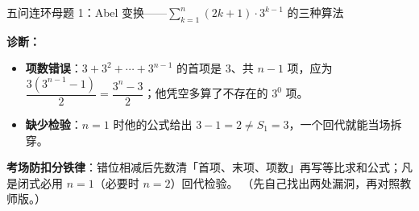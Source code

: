 \begin{methodbox}{五问连环母题 1：Abel 变换——$\sum_{k=1}^n(2k+1)\cdot3^{k-1}$ 的三种算法}
\begin{enumerate}[label=(\arabic*), itemsep=5pt]
\ifteacher
{\bfseries\color{main}诊断：}
\begin{itemize}[itemsep=1pt]
\item \textbf{项数错误}：$3+3^2+\cdots+3^{n-1}$ 的首项是 $3$、共 $n-1$ 项，应为 $\dfrac{3(3^{n-1}-1)}{2}=\dfrac{3^n-3}{2}$；他凭空多算了不存在的 $3^0$ 项。
\item \textbf{缺少检验}：$n=1$ 时他的公式给出 $3-1=2\ne S_1=3$，一个回代就能当场拆穿。
\end{itemize}

\textbf{考场防扣分铁律}：错位相减后先数清「首项、末项、项数」再写等比求和公式；凡是闭式必用 $n=1$（必要时 $n=2$）回代检验。
\else
{\small（先自己找出两处漏洞，再对照教师版。）}
\fi
{}

\end{enumerate}
\end{methodbox}


